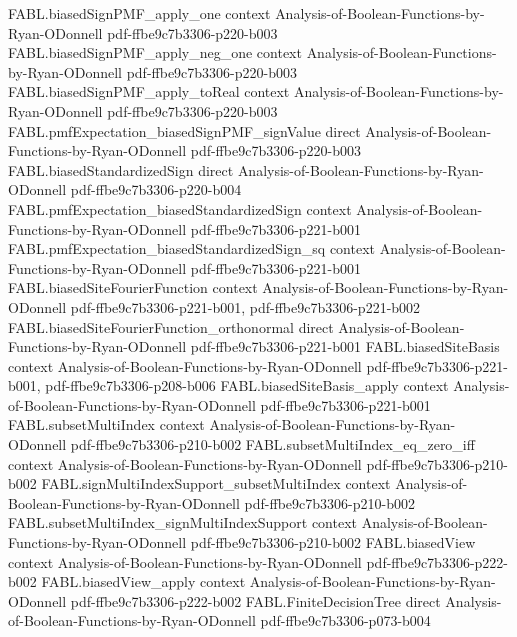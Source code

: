 \begin{theorem}
\proofstep
  {FABL.biasedSignPMF_apply_one}
  {context}
  {Analysis-of-Boolean-Functions-by-Ryan-ODonnell}
  {pdf-ffbe9c7b3306-p220-b003}
\proofstep
  {FABL.biasedSignPMF_apply_neg_one}
  {context}
  {Analysis-of-Boolean-Functions-by-Ryan-ODonnell}
  {pdf-ffbe9c7b3306-p220-b003}
\proofstep
  {FABL.biasedSignPMF_apply_toReal}
  {context}
  {Analysis-of-Boolean-Functions-by-Ryan-ODonnell}
  {pdf-ffbe9c7b3306-p220-b003}
\proofstep
  {FABL.pmfExpectation_biasedSignPMF_signValue}
  {direct}
  {Analysis-of-Boolean-Functions-by-Ryan-ODonnell}
  {pdf-ffbe9c7b3306-p220-b003}
\proofstep
  {FABL.biasedStandardizedSign}
  {direct}
  {Analysis-of-Boolean-Functions-by-Ryan-ODonnell}
  {pdf-ffbe9c7b3306-p220-b004}
\proofstep
  {FABL.pmfExpectation_biasedStandardizedSign}
  {context}
  {Analysis-of-Boolean-Functions-by-Ryan-ODonnell}
  {pdf-ffbe9c7b3306-p221-b001}
\proofstep
  {FABL.pmfExpectation_biasedStandardizedSign_sq}
  {context}
  {Analysis-of-Boolean-Functions-by-Ryan-ODonnell}
  {pdf-ffbe9c7b3306-p221-b001}
\proofstep
  {FABL.biasedSiteFourierFunction}
  {context}
  {Analysis-of-Boolean-Functions-by-Ryan-ODonnell}
  {pdf-ffbe9c7b3306-p221-b001,
    pdf-ffbe9c7b3306-p221-b002}
\proofstep
  {FABL.biasedSiteFourierFunction_orthonormal}
  {direct}
  {Analysis-of-Boolean-Functions-by-Ryan-ODonnell}
  {pdf-ffbe9c7b3306-p221-b001}
\proofstep
  {FABL.biasedSiteBasis}
  {context}
  {Analysis-of-Boolean-Functions-by-Ryan-ODonnell}
  {pdf-ffbe9c7b3306-p221-b001,
    pdf-ffbe9c7b3306-p208-b006}
\proofstep
  {FABL.biasedSiteBasis_apply}
  {context}
  {Analysis-of-Boolean-Functions-by-Ryan-ODonnell}
  {pdf-ffbe9c7b3306-p221-b001}
\proofstep
  {FABL.subsetMultiIndex}
  {context}
  {Analysis-of-Boolean-Functions-by-Ryan-ODonnell}
  {pdf-ffbe9c7b3306-p210-b002}
\proofstep
  {FABL.subsetMultiIndex_eq_zero_iff}
  {context}
  {Analysis-of-Boolean-Functions-by-Ryan-ODonnell}
  {pdf-ffbe9c7b3306-p210-b002}
\proofstep
  {FABL.signMultiIndexSupport_subsetMultiIndex}
  {context}
  {Analysis-of-Boolean-Functions-by-Ryan-ODonnell}
  {pdf-ffbe9c7b3306-p210-b002}
\proofstep
  {FABL.subsetMultiIndex_signMultiIndexSupport}
  {context}
  {Analysis-of-Boolean-Functions-by-Ryan-ODonnell}
  {pdf-ffbe9c7b3306-p210-b002}
\proofstep
  {FABL.biasedView}
  {context}
  {Analysis-of-Boolean-Functions-by-Ryan-ODonnell}
  {pdf-ffbe9c7b3306-p222-b002}
\proofstep
  {FABL.biasedView_apply}
  {context}
  {Analysis-of-Boolean-Functions-by-Ryan-ODonnell}
  {pdf-ffbe9c7b3306-p222-b002}
\proofstep
  {FABL.FiniteDecisionTree}
  {direct}
  {Analysis-of-Boolean-Functions-by-Ryan-ODonnell}
  {pdf-ffbe9c7b3306-p073-b004}

\end{theorem}
